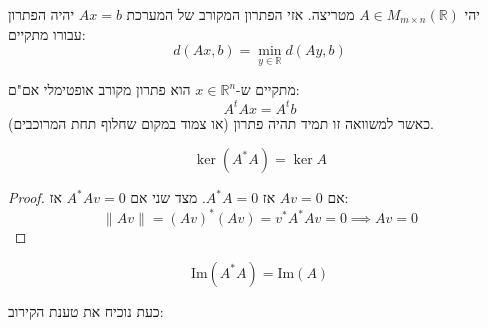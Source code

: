 \documentclass{tstextbook}
\begin{document}
\begin{definition}
יהי \(A \in M_{m\times n}\left( \mathbb{R} \right)\) מטריצה. אזי הפתרון המקורב של המערכת \(Ax=b\) יהיה הפתרון עבורו מתקיים:
$$d(Ax,b)=\min_{y \in \mathbb{R}} d(Ay,b)$$

\end{definition}
\begin{proposition}
מתקיים ש-\(x \in \mathbb{R}^{n}\) הוא פתרון מקורב אופטימלי אם"ם:
$$A^{t}A x = A^{t} b$$
(או צמוד במקום שחלוף תחת המרוכבים) כאשר למשוואה זו תמיד תהיה פתרון.

\end{proposition}
\begin{lemma}
$$\ker  (A^{*}A)=\ker A$$

\end{lemma}
\begin{proof}
אם \(Av=0\) אז \(A^{*}A=0\). מצד שני אם \(A^{*}Av=0\) אז:
$$\lVert Av \rVert =(Av)^{*}(Av)=v^{*}A^{*}Av=0\implies Av=0$$

\end{proof}
$$\mathrm{Im}(A^{*}A)=\mathrm{Im}(A)$$

כעת נוכיח את טענת הקירוב:
\end{document}
